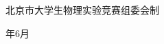 {\begin{center}
        \vspace{2.5cm}

        {\fontsize{13pt}{16pt}\selectfont\songti 北京市大学生物理实验竞赛组委会制}

        \vspace{0.5cm}

        {\fontsize{13pt}{16pt}\selectfont\songti \competitionYear{}年6月}

    \end{center}

    \clearpage
}

